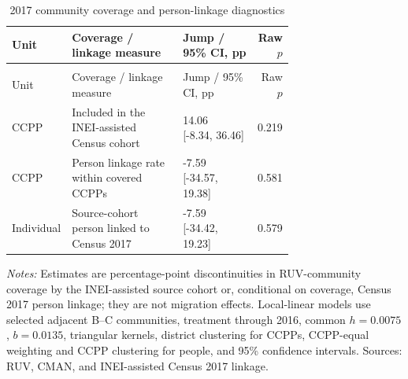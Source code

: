 \begingroup\fontsize{9.25}{11.4}\selectfont
\setlength{\tabcolsep}{3pt}\renewcommand{\arraystretch}{1.18}
\begin{longtable}{@{}>{\raggedright\arraybackslash}lp{0.42\linewidth}p{0.29\linewidth}r@{}}
\caption{2017 community coverage and person-linkage diagnostics}\label{tab:pub_A10} \\
\toprule Unit & Coverage / linkage measure & Jump / 95\% CI, pp & Raw \(p\) \\ \midrule\endfirsthead
\multicolumn{4}{c}{\tablename\ \thetable{} -- continued} \\
\toprule Unit & Coverage / linkage measure & Jump / 95\% CI, pp & Raw \(p\) \\ \midrule\endhead
CCPP & Included in the INEI-assisted Census cohort & \shortstack[r]{14.06 \\{} [-8.34, 36.46]} & 0.219 \\
CCPP & Person linkage rate within covered CCPPs & \shortstack[r]{-7.59 \\{} [-34.57, 19.38]} & 0.581 \\
Individual & Source-cohort person linked to Census 2017 & \shortstack[r]{-7.59 \\{} [-34.42, 19.23]} & 0.579 \\
\bottomrule\end{longtable}
\parbox{0.97\linewidth}{\footnotesize \textit{Notes:} Estimates are percentage-point discontinuities in RUV-community coverage by the INEI-assisted source cohort or, conditional on coverage, Census 2017 person linkage; they are not migration effects. Local-linear models use selected adjacent B--C communities, treatment through 2016, common \(h=0.0075\), \(b=0.0135\), triangular kernels, district clustering for CCPPs, CCPP-equal weighting and CCPP clustering for people, and 95\% confidence intervals. Sources: RUV, CMAN, and INEI-assisted Census 2017 linkage.}
\par{}\par\endgroup
